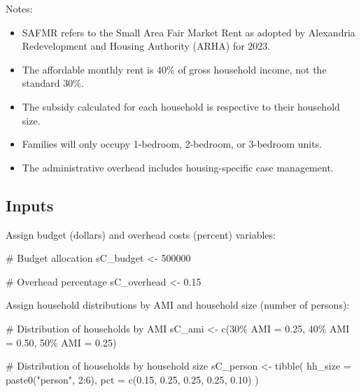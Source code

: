 \documentclass[
  10pt,
  letterpaper,
  DIV=11,
  numbers=noendperiod]{scrartcl}
\newenvironment{Shaded}{\begin{snugshade}}{\end{snugshade}}
\newcommand{\AttributeTok}[1]{\textcolor[rgb]{0.40,0.45,0.13}{#1}}
\newcommand{\CommentTok}[1]{\textcolor[rgb]{0.37,0.37,0.37}{#1}}
\newcommand{\DecValTok}[1]{\textcolor[rgb]{0.68,0.00,0.00}{#1}}
\newcommand{\FloatTok}[1]{\textcolor[rgb]{0.68,0.00,0.00}{#1}}
\newcommand{\FunctionTok}[1]{\textcolor[rgb]{0.28,0.35,0.67}{#1}}
\newcommand{\NormalTok}[1]{\textcolor[rgb]{0.00,0.23,0.31}{#1}}
\newcommand{\OtherTok}[1]{\textcolor[rgb]{0.00,0.23,0.31}{#1}}
\newcommand{\SpecialCharTok}[1]{\textcolor[rgb]{0.37,0.37,0.37}{#1}}
\newcommand{\StringTok}[1]{\textcolor[rgb]{0.13,0.47,0.30}{#1}}
\providecommand{\tightlist}{%
  \setlength{\itemsep}{0pt}\setlength{\parskip}{0pt}}\usepackage{longtable,booktabs,array}
\begin{document}
Notes:

\begin{itemize}
\tightlist
\item
  SAFMR refers to the Small Area Fair Market Rent as adopted by
  Alexandria Redevelopment and Housing Authority (ARHA) for 2023.
\item
  The affordable monthly rent is 40\% of gross household income, not the
  standard 30\%.
\item
  The subsidy calculated for each household is respective to their
  household size.
\item
  Families will only occupy 1-bedroom, 2-bedroom, or 3-bedroom units.
\item
  The administrative overhead includes housing-specific case management.
\end{itemize}

\newpage

\subsection{Inputs}\label{inputs-2}

Assign budget (dollars) and overhead costs (percent) variables:

\begin{Shaded}
\begin{Highlighting}[]
\CommentTok{\# Budget allocation}
\NormalTok{sC\_budget }\OtherTok{\textless{}{-}} \DecValTok{500000}

\CommentTok{\# Overhead percentage}
\NormalTok{sC\_overhead }\OtherTok{\textless{}{-}} \FloatTok{0.15}
\end{Highlighting}
\end{Shaded}

Assign household distributions by AMI and household size (number of
persons):

\begin{Shaded}
\begin{Highlighting}[]
\CommentTok{\# Distribution of households by AMI}
\NormalTok{sC\_ami }\OtherTok{\textless{}{-}} \FunctionTok{c}\NormalTok{(}\StringTok{\textasciigrave{}}\AttributeTok{30\% AMI}\StringTok{\textasciigrave{}} \OtherTok{=} \FloatTok{0.25}\NormalTok{, }\StringTok{\textasciigrave{}}\AttributeTok{40\% AMI}\StringTok{\textasciigrave{}} \OtherTok{=} \FloatTok{0.50}\NormalTok{, }\StringTok{\textasciigrave{}}\AttributeTok{50\% AMI}\StringTok{\textasciigrave{}} \OtherTok{=} \FloatTok{0.25}\NormalTok{)}

\CommentTok{\# Distribution of households by household size}
\NormalTok{sC\_person }\OtherTok{\textless{}{-}} \FunctionTok{tibble}\NormalTok{(}
  \AttributeTok{hh\_size =} \FunctionTok{paste0}\NormalTok{(}\StringTok{"person"}\NormalTok{, }\DecValTok{2}\SpecialCharTok{:}\DecValTok{6}\NormalTok{),}
  \AttributeTok{pct =} \FunctionTok{c}\NormalTok{(}\FloatTok{0.15}\NormalTok{, }\FloatTok{0.25}\NormalTok{, }\FloatTok{0.25}\NormalTok{, }\FloatTok{0.25}\NormalTok{, }\FloatTok{0.10}\NormalTok{)}
\NormalTok{)}
\end{Highlighting}
\end{Shaded}
\end{document}
